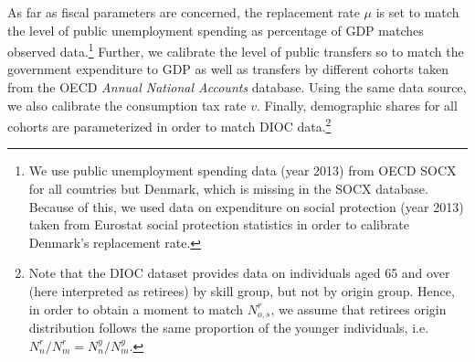 \documentclass[a4paper,12pt]{article}
\begin{document}
As far as fiscal parameters are concerned, the replacement rate $\mu$ is set to match the level of public unemployment spending as percentage of GDP matches observed data.\footnote{We use public unemployment spending data (year  2013) from OECD SOCX for all countries but Denmark, which is missing in the SOCX database. Because of this, we used data on expenditure on social protection (year 2013) taken from Eurostat social protection statistics in order to calibrate Denmark's replacement rate.} Further, we calibrate the level of public transfers so to match the government expenditure to GDP as well as transfers by different cohorts taken from the OECD \textit{Annual National Accounts} database. Using the same data source, we also calibrate the consumption tax rate $v$. Finally, demographic shares for all cohorts are parameterized in order to match DIOC data.\footnote{Note that the DIOC dataset provides data on individuals aged 65 and over (here interpreted as retirees) by skill group, but not by origin group. Hence, in order to obtain a moment to match $N^r_{o,s}$, we assume that retirees origin distribution follows the same proportion of the younger individuals, i.e. $N^r_n/N^r_m=N^y_n/N^y_m$.}
\end{document}
